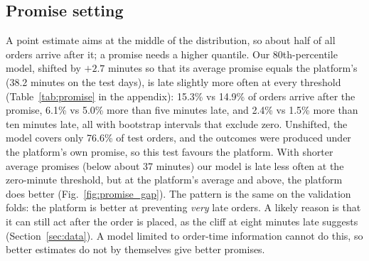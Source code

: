 \subsection{Promise setting}
A point estimate aims at the middle of the distribution, so about half of all orders arrive after it;
a promise needs a higher quantile. Our 80th-percentile model, shifted by $+2.7$ minutes so that its
average promise equals the platform's (38.2 minutes on the test days), is late slightly more often at
every threshold (Table~\ref{tab:promise} in the appendix): 15.3\% vs 14.9\% of orders arrive after the
promise, 6.1\% vs 5.0\% more than five minutes late, and 2.4\% vs 1.5\% more than ten minutes late, all
with bootstrap intervals that exclude zero. Unshifted, the model covers only 76.6\% of test orders, and
the outcomes were produced under the platform's own promise, so this test favours the platform. With
shorter average promises (below about 37 minutes) our
model is late less often at the zero-minute threshold, but at the platform's average and above, the
platform does better (Fig.~\ref{fig:promise_gap}). The pattern is the same on the validation folds: the
platform is better at preventing \emph{very} late orders. A likely reason is that it can still act after
the order is placed, as the cliff at eight minutes late suggests (Section~\ref{sec:data}). A model
limited to order-time information cannot do this, so better estimates do not by themselves give better
promises.
